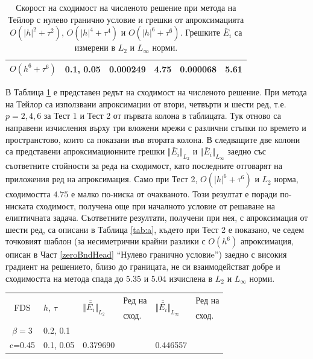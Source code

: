 \documentclass[a4paper]{article}
\theoremstyle{remark}
\begin{document}
\begin{large}
\begin{table}[ht]
\begin{tabular}{||c|l|ll|ll||}
 $O(h^6+ \tau^6)$ 	&0.1, 0.05 	& 0.000249 	& 4.75 	& 0.000068  & 5.61        \\
\hline
\hline 
		\end{tabular}
		\caption{Скорост на сходимост на численото решение при метода на Тейлор с нулево гранично условие и грешки от апроксимацията $O(|h|^{2} + \tau^2 )$, $O(|h|^{4} + \tau^4 )$ и $O(|h|^{6} + \tau^6 )$. Грешките $\bar E_i$ са измерени в $L_2$ и $L_\infty$ норми.}
\label{tableA}
\end{table}
В Таблица \ref{tableA} е представен редът на сходимост на численото решение. При метода на Тейлор са използвани апроксимации от втори, четвърти и шести ред, т.е. $p=2,4,6$ за Тест 1 и Тест 2 от първата колона в таблицата. Тук отново са направени изчисления върху три вложени мрежи с различни стъпки по времето и пространстово, които са показани във втората колона. В следващите две колони са представени апроксимационните грешки $\Vert \bar E_i \Vert_{L_2} $ и $\Vert \bar E_i \Vert_{L_\infty}$ заедно със съответните стойности за реда на сходимост, като последните отговарят на приложения ред на апроксимация. Само при Тест 2, $O(|h|^6 + \tau^6)$ и $L_2$ норма, сходимостта $4.75$ е малко по-ниска от очакваното. Този резултат е поради по-ниската сходимост, получена още при началното условие от решаване на елиптичната задача. Съответните резултати, получени при нея, с апроксимация от шести ред, са описани в Таблица \ref{tab:a}, където при Тест 2 е показано, че седем точковият шаблон (за несиметрични крайни разлики с $O(h^6)$ апроксимация, описан в Част \ref{zeroBndHead} ``Нулево гранично условиe'') заедно с високия градиент на решението, близо до границата, не си взаимодействат добре и сходимостта на метода спада до $5.35$ и $5.04$ изчислена в $L_2$ и $L_\infty$ норми. 
\begin{table}[ht]
\centering
\small
		\begin{tabular}{||c|l|ll|ll||}
			\hline
			\hline
      \multirow{2  }{*}{FDS}        & \multirow{2  }{*}{$h$, $\tau$}  &  	\multirow{2  }{*}{ $\Vert \bar{\bar{ E_i}} \Vert_{L_2}$ }	&Ред на	& \multirow{2  }{*}{ $\Vert \bar{\bar{ E_i}} \Vert_{L_\infty}$ } 		&Ред на   \\
	                                        &                                                & 							 					&  сход. 	& 								       					& сход. \\
   			\hline 
					\hline 
  $\beta=3$             	&0.2, 0.1         	&              	&          	&                     &      \\
   c=0.45                 	&0.1, 0.05         	&0.379690  	&          	&0.446557 		&       \\

\end{tabular}
\end{table}
\end{large}
\end{document}
